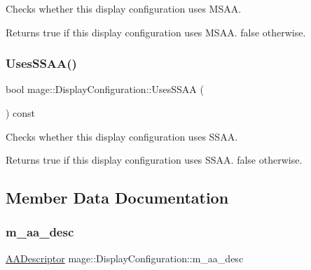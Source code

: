Checks whether this display configuration uses M\+S\+AA.

\begin{DoxyReturn}{Returns}
{\ttfamily true} if this display configuration uses M\+S\+AA. {\ttfamily false} otherwise. 
\end{DoxyReturn}
\hypertarget{structmage_1_1_display_configuration_a61dcb66358a3fd9e4df2230946ce1a36}{}\label{structmage_1_1_display_configuration_a61dcb66358a3fd9e4df2230946ce1a36} 
\subsubsection{\texorpdfstring{Uses\+S\+S\+A\+A()}{UsesSSAA()}}
{\footnotesize\ttfamily bool mage\+::\+Display\+Configuration\+::\+Uses\+S\+S\+AA (\begin{DoxyParamCaption}{ }\end{DoxyParamCaption}) const\hspace{0.3cm}{\ttfamily [noexcept]}}

Checks whether this display configuration uses S\+S\+AA.

\begin{DoxyReturn}{Returns}
{\ttfamily true} if this display configuration uses S\+S\+AA. {\ttfamily false} otherwise. 
\end{DoxyReturn}


\subsection{Member Data Documentation}
\hypertarget{structmage_1_1_display_configuration_a253dc142f092f327649aed3c8ca6c95f}{}\label{structmage_1_1_display_configuration_a253dc142f092f327649aed3c8ca6c95f} 
\subsubsection{\texorpdfstring{m\+\_\+aa\+\_\+desc}{m\_aa\_desc}}
{\footnotesize\ttfamily \hyperlink{namespacemage_a86cd40b8f2f42ca4d616cc6ec665a7f2}{A\+A\+Descriptor} mage\+::\+Display\+Configuration\+::m\+\_\+aa\+\_\+desc\hspace{0.3cm}{\ttfamily [private]}}

